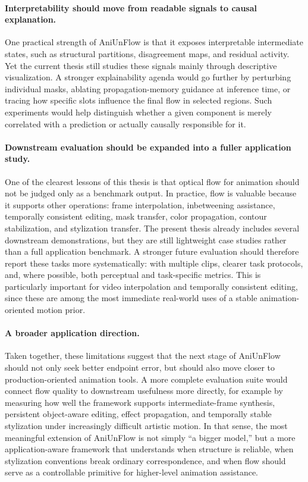 \paragraph{Interpretability should move from readable signals to causal explanation.}
One practical strength of AniUnFlow is that it exposes interpretable intermediate states, such as structural partitions, disagreement maps, and residual activity. Yet the current thesis still studies these signals mainly through descriptive visualization. A stronger explainability agenda would go further by perturbing individual masks, ablating propagation-memory guidance at inference time, or tracing how specific slots influence the final flow in selected regions. Such experiments would help distinguish whether a given component is merely correlated with a prediction or actually causally responsible for it.

\paragraph{Downstream evaluation should be expanded into a fuller application study.}
One of the clearest lessons of this thesis is that optical flow for animation should not be judged only as a benchmark output. In practice, flow is valuable because it supports other operations: frame interpolation, inbetweening assistance, temporally consistent editing, mask transfer, color propagation, contour stabilization, and stylization transfer. The present thesis already includes several downstream demonstrations, but they are still lightweight case studies rather than a full application benchmark. A stronger future evaluation should therefore report these tasks more systematically: with multiple clips, clearer task protocols, and, where possible, both perceptual and task-specific metrics. This is particularly important for video interpolation and temporally consistent editing, since these are among the most immediate real-world uses of a stable animation-oriented motion prior.

\paragraph{A broader application direction.}
Taken together, these limitations suggest that the next stage of AniUnFlow should not only seek better endpoint error, but should also move closer to production-oriented animation tools. A more complete evaluation suite would connect flow quality to downstream usefulness more directly, for example by measuring how well the framework supports intermediate-frame synthesis, persistent object-aware editing, effect propagation, and temporally stable stylization under increasingly difficult artistic motion. In that sense, the most meaningful extension of AniUnFlow is not simply ``a bigger model,'' but a more application-aware framework that understands when structure is reliable, when stylization conventions break ordinary correspondence, and when flow should serve as a controllable primitive for higher-level animation assistance.

